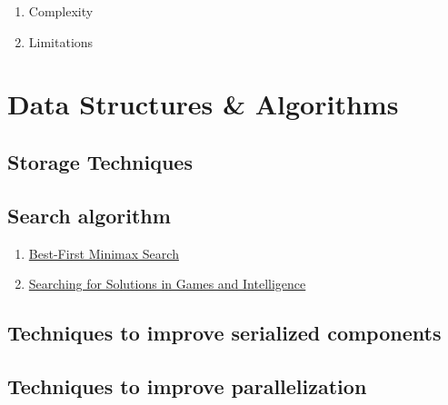 \documentclass[12pt]{article}
\begin{document}
\begin{enumerate}
  \item Complexity
  \item Limitations
\end{enumerate}
  


\section{Data Structures \& Algorithms}

\subsection{Storage Techniques}

\subsection{Search algorithm}

\begin{enumerate}
  \item \href{http://www.aaai.org/Papers/AAAI/1994/AAAI94-210.pdf}{Best-First
      Minimax Search}
  \item
    \href{http://digitalarchive.maastrichtuniversity.nl/fedora/get/guid:36b5cf0a-cf06-4602-afdb-1af04d65c23b/ASSET1}{Searching
    for Solutions in Games and Intelligence}
\end{enumerate}

\subsection{Techniques to improve serialized components}

\subsection{Techniques to improve parallelization}
\end{document}
